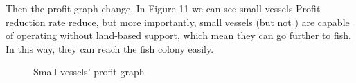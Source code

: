 \documentclass{mcmthesis}
\begin{document}
Then the profit graph change. In Figure 11 we can see small vessels Profit reduction rate reduce, but more importantly, small vessels (but not ) are capable of operating without land-based support, which mean they can go further to fish. In this way, they can reach the fish colony easily. 

\begin{figure}[htbp]
  \centering
  \centering
  \caption{Small vessels' profit graph}
\end{figure}
\end{document}
